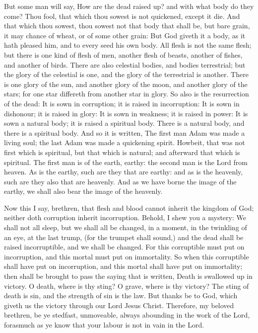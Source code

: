 {But some man will say, How are the dead raised up? and with what body do they come? Thou fool, that which thou sowest is not quickened, except it die. And that which thou sowest, thou sowest not that body that shall be, but bare grain, it may chance of wheat, or of some other grain: But God giveth it a body, as it hath pleased him, and to every seed his own body. All flesh is not the same flesh; but there is one kind of flesh of men, another flesh of beasts, another of fishes, and another of birds. There are also celestial bodies, and bodies terrestrial; but the glory of the celestial is one, and the glory of the terrestrial is another. There is one glory of the sun, and another glory of the moon, and another glory of the stars; for one star differeth from another star in glory. So also is the resurrection of the dead: It is sown in corruption; it is raised in incorruption: It is sown in dishonour; it is raised in glory: It is sown in weakness; it is raised in power: It is sown a natural body; it is raised a spiritual body. There is a natural body, and there is a spiritual body. And so it is written, The first man Adam was made a living soul; the last Adam was made a quickening spirit. Howbeit, that was not first which is spiritual, but that which is natural; and afterward that which is spiritual. The first man is of the earth, earthy: the second man is the Lord from heaven. As is the earthy, such are they that are earthy: and as is the heavenly, such are they also that are heavenly. And as we have borne the image of the earthy, we shall also bear the image of the heavenly. 

Now this I say, brethren, that flesh and blood cannot inherit the kingdom of God; neither doth corruption inherit incorruption. Behold, I shew you a mystery: We shall not all sleep, but we shall all be changed, in a moment, in the twinkling of an eye, at the last trump, (for the trumpet shall sound,) and the dead shall be raised incorruptible, and we shall be changed. For this corruptible must put on incorruption, and this mortal must put on immortality. So when this corruptible shall have put on incorruption, and this mortal shall have put on immortality; then shall be brought to pass the saying that is written, Death is swallowed up in victory. O death, where is thy sting? O grave, where is thy victory? The sting of death is sin, and the strength of sin is the law. But thanks be to God, which giveth us the victory through our Lord Jesus Christ. Therefore, my beloved brethren, be ye stedfast, unmoveable, always abounding in the work of the Lord, forasmuch as ye know that your labour is not in vain in the Lord.}

